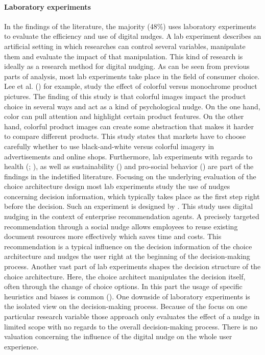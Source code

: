 \paragraph{Laboratory experiments}
In the findings of the literature, the majority (48\%) uses laboratory experiments to evaluate the efficiency and use of digital nudges. A lab experiment describes an artificial setting in which researches can control several variables, manipulate them and evaluate the impact of that manipulation. This kind of research is ideally as a research method for digital nudging. As can be seen from previous parts of analysis, most lab experiments take place in the field of consumer choice. Lee et al. (\citeyear{lee_monochrome_2014}) for example, study the effect of colorful versus monochrome product pictures. The finding of this study is that colorful images impact the product choice in several ways and act as a kind of psychological nudge.
On the one hand, color can pull attention and highlight certain product features. On the other hand, colorful product images can create some abstraction that makes it harder to compare different products. This study states that markets have to choose carefully whether to use black-and-white versus colorful imagery in advertisements and online shops.
Furthermore, lab experiments with regards to health (\cite{laran_nonconscious_2018}; \cite{langley_should_2015}), as well as sustainability (\cite{bruns_can_2018}) and pro-social behavior (\cite{zarghamee_nudging_2017}) are part of the findings in the indetified literature. Focusing on the underlying evaluation of the choice architecture design most lab experiments study the use of nudges concerning decision information, which typically takes place as the first step right before the decision. Such an experiment is designed by \cite{kretzer_designing_2018}. This study uses digital nudging in the context of enterprise recommendation agents. A precisely targeted recommendation through a social nudge allows employees to reuse existing document resources more effectively which saves time and costs. This recommendation is a typical influence on the decision information of the choice architecture and nudges the user right at the beginning of the decision-making process. 
Another vast part of lab experiments shapes the decision structure of the choice architecture. Here, the choice architect manipulates the decision itself, often through the change of choice options. In this part the usage of specific heuristics and biases is common (\cite{tversky_judgment_1974}).
One downside of laboratory experiments is the isolated view on the decision-making process. Because of the focus on one particular research variable those approach only evaluates the effect of a nudge in limited scope with no regards to the overall decision-making process. There is no valuation concerning the influence of the digital nudge on the whole user experience.
 
